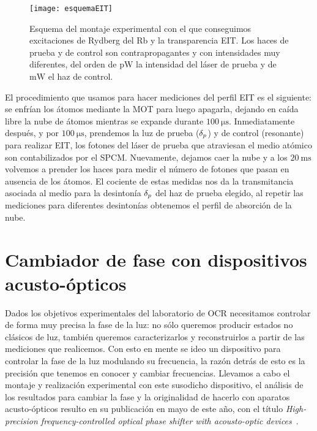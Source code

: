 \begin{figure}
\centering
\begin{minipage}{0.8\textwidth}
\centering
\texttt{[image: esquemaEIT]}
\caption{\label{fig:esquemaEIT}Esquema del montaje experimental con el que conseguimos excitaciones de Rydberg del Rb y la transparencia EIT. Los haces de prueba y de control son contrapropagantes y con intensidades muy diferentes, del orden de $\si{\pico\watt}$ la intensidad del láser de prueba y de $\si{\milli\watt}$ el haz de control.}
\end{minipage}
\end{figure}

\p El procedimiento que usamos para hacer mediciones del perfil EIT es el siguiente: se enfrían los átomos mediante la MOT para luego apagarla, dejando en caída libre la nube de átomos mientras se expande durante $\SI{100}{\micro\second}$. Inmediatamente después, y por $\SI{100}{\micro\second}$, prendemos la luz de prueba ($\delta_{p}$) y de control (resonante) para realizar EIT, los fotones del láser de prueba que atraviesan el medio atómico son contabilizados por el SPCM. Nuevamente, dejamos caer la nube y a los $\SI{20}{\milli\second}$ volvemos a prender los haces para medir el número de fotones que pasan en ausencia de los átomos. El cociente de estas medidas nos da la transmitancia asociada al medio para la desintonía $\delta_{p}$ del haz de prueba elegido, al repetir las mediciones para diferentes desintonías obtenemos el perfil de absorción de la nube.

\section{\label{sec:cambiadorFase}Cambiador de fase con dispositivos acusto-ópticos}

Dados los objetivos experimentales del laboratorio de OCR necesitamos controlar de forma muy precisa la fase de la luz: no sólo queremos producir estados no clásicos de luz, también queremos caracterizarlos y reconstruirlos a partir de las mediciones que realicemos. Con esto en mente se ideo un dispositivo para controlar la fase de la luz modulando su frecuencia, la razón detrás de esto es la precisión que tenemos en conocer y cambiar frecuencias. Llevamos a cabo el montaje y realización experimental con este susodicho dispositivo, el análisis de los resultados para cambiar la fase y la originalidad de hacerlo con aparatos acusto-ópticos resulto en su publicación en mayo de este año, con el título \emph{High-precision frequency-controlled optical phase shifter with acousto-optic devices}~\cite{esquivel}.


